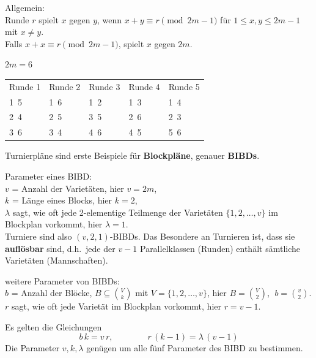 \begin{algorithmus}[Rundenturnier]
Allgemein:\\
Runde $r$ spielt $x$ gegen $y$, wenn $x + y \equiv r \pmod{2m - 1}$ für $1 \leq x, y \leq 2m - 1$ mit $x \neq y$.\\
Falls $x + x \equiv r \pmod{2m - 1}$, spielt $x$ gegen $2m$.
\end{algorithmus}

\begin{beispiel}
$2m = 6$
\begin{center}
\begin{tabular}{lllll}
Runde 1 & Runde 2 & Runde 3 & Runde 4 & Runde 5 \\
1\ 5 & 1\ 6 & 1\ 2 & 1\ 3 & 1\ 4 \\
2\ 4 & 2\ 5 & 3\ 5 & 2\ 6 & 2\ 3 \\
3\ 6 & 3\ 4 & 4\ 6 & 4\ 5 & 5\ 6
\end{tabular}
\end{center}
\end{beispiel}

Turnierpläne sind erste Beispiele für \textbf{Blockpläne}, genauer \textbf{BIBDs}.

\begin{definition}
Parameter eines BIBD:\\
$v$ = Anzahl der Varietäten, hier $v = 2m$,\\
$k$ = Länge eines Blocks, hier $k = 2$,\\
$\lambda$ sagt, wie oft jede 2-elementige Teilmenge der Varietäten $\{1, 2, \ldots, v\}$ im Blockplan vorkommt, hier $\lambda = 1$.\\
Turniere sind also $(v, 2, 1)$-BIBDs. Das Besondere an Turnieren ist, dass sie \textbf{auflösbar} sind, d.h.\ jede der $v - 1$ Parallelklassen (Runden) enthält sämtliche Varietäten (Mannschaften).

weitere Parameter von BIBDs:\\
$b$ = Anzahl der Blöcke, $B \subseteq \binom{V}{k}$ mit $V = \{1, 2, \ldots, v\}$, hier $B = \binom{V}{2}$, $\; b = \binom{v}{2}$.\\
$r$ sagt, wie oft jede Varietät im Blockplan vorkommt, hier $r = v - 1$.
\end{definition}

\begin{satz}
Es gelten die Gleichungen
\[ b\,k = v\,r, \qquad\qquad r\,(k - 1) = \lambda\,(v - 1) \]
Die Parameter $v, k, \lambda$ genügen um alle fünf Parameter des BIBD zu bestimmen.
\end{satz}

